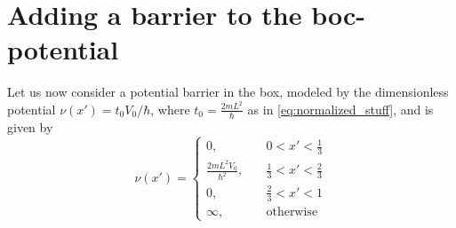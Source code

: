 \section{Adding a barrier to the boc-potential}
Let us now consider a potential barrier in the box, modeled by the dimensionless potential $\nu(x') = t_0V_0/\hbar$, where $t_0 =\frac{2mL^2}{\hbar}$ as in \cref{eq:normalized_stuff}, and is given by
\begin{equation} 
\nu(x') = \begin{cases}
0,\quad &0<x'<\frac{1}{3} \\
\frac{2mL^2V_0}{\hbar^2},\quad &\frac{1}{3}<x'<\frac{2}{3} \\
0,\quad &\frac{2}{3}<x'<1 \\
\infty ,\quad &\text{otherwise}
\end{cases}
\end{equation}